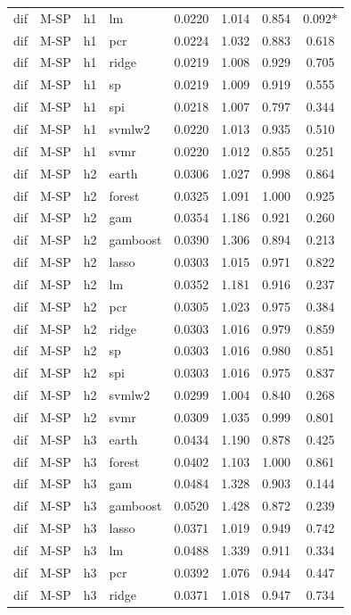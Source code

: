 \begin{ThreePartTable}
\begin{longtable}[t]{llclcccc}
dif & M-SP & h1 & lm & 0.0220 & 1.014 & 0.854 & 0.092*\\
dif & M-SP & h1 & pcr & 0.0224 & 1.032 & 0.883 & 0.618\\
dif & M-SP & h1 & ridge & 0.0219 & 1.008 & 0.929 & 0.705\\
dif & M-SP & h1 & sp & 0.0219 & 1.009 & 0.919 & 0.555\\
dif & M-SP & h1 & spi & 0.0218 & 1.007 & 0.797 & 0.344\\
dif & M-SP & h1 & svmlw2 & 0.0220 & 1.013 & 0.935 & 0.510\\
dif & M-SP & h1 & svmr & 0.0220 & 1.012 & 0.855 & 0.251\\
\addlinespace
dif & M-SP & h2 & earth & 0.0306 & 1.027 & 0.998 & 0.864\\
dif & M-SP & h2 & forest & 0.0325 & 1.091 & 1.000 & 0.925\\
dif & M-SP & h2 & gam & 0.0354 & 1.186 & 0.921 & 0.260\\
dif & M-SP & h2 & gamboost & 0.0390 & 1.306 & 0.894 & 0.213\\
dif & M-SP & h2 & lasso & 0.0303 & 1.015 & 0.971 & 0.822\\
dif & M-SP & h2 & lm & 0.0352 & 1.181 & 0.916 & 0.237\\
dif & M-SP & h2 & pcr & 0.0305 & 1.023 & 0.975 & 0.384\\
dif & M-SP & h2 & ridge & 0.0303 & 1.016 & 0.979 & 0.859\\
dif & M-SP & h2 & sp & 0.0303 & 1.016 & 0.980 & 0.851\\
dif & M-SP & h2 & spi & 0.0303 & 1.016 & 0.975 & 0.837\\
dif & M-SP & h2 & svmlw2 & 0.0299 & 1.004 & 0.840 & 0.268\\
dif & M-SP & h2 & svmr & 0.0309 & 1.035 & 0.999 & 0.801\\
\addlinespace
dif & M-SP & h3 & earth & 0.0434 & 1.190 & 0.878 & 0.425\\
dif & M-SP & h3 & forest & 0.0402 & 1.103 & 1.000 & 0.861\\
dif & M-SP & h3 & gam & 0.0484 & 1.328 & 0.903 & 0.144\\
dif & M-SP & h3 & gamboost & 0.0520 & 1.428 & 0.872 & 0.239\\
dif & M-SP & h3 & lasso & 0.0371 & 1.019 & 0.949 & 0.742\\
dif & M-SP & h3 & lm & 0.0488 & 1.339 & 0.911 & 0.334\\
dif & M-SP & h3 & pcr & 0.0392 & 1.076 & 0.944 & 0.447\\
dif & M-SP & h3 & ridge & 0.0371 & 1.018 & 0.947 & 0.734\\

\end{longtable}
\end{ThreePartTable}
